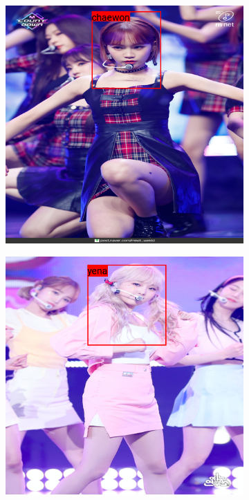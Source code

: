\begin{figure}[htbp]
    \centering
    \begin{subfigure}[b]{0.32\textwidth}
        \centering
        \includegraphics[width=\textwidth]{images/introduction/chaewon-correct.png}
    \end{subfigure}
    \hfill
    \begin{subfigure}[b]{0.32\textwidth}
        \centering
        \includegraphics[width=\textwidth]{images/introduction/yena-correct.png}

\end{subfigure}
\end{figure}
